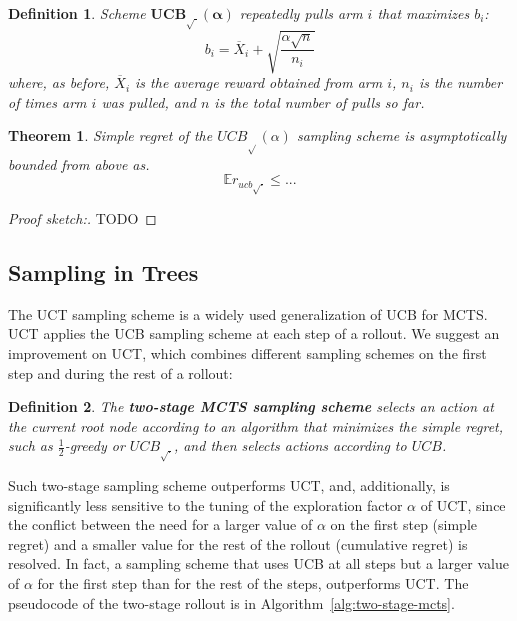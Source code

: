 \documentclass[letterpaper]{article}
\newcommand {\IE} {\ensuremath {\mathbb{E}}}
\newtheorem{dfn}{Definition}
\newtheorem{thm}{Theorem}
\begin{document}
\begin{dfn} Scheme $\mathbf{UCB_{\sqrt{\cdot}}(\alpha)}$ repeatedly pulls arm $i$ that
maximizes $b_i$:
\begin{equation}
b_i=\overline X_i+\sqrt {\frac {\alpha \sqrt n} {n_i}}
\end{equation}
where, as before, $\overline X_i$ is the average reward obtained from arm $i$,
$n_i$ is the number of times arm $i$ was pulled, and $n$ is the total
number of pulls so far. \end{dfn}

\begin{thm} Simple regret of the $UCB_{\sqrt{}}(\alpha)$ sampling
  scheme is asymptotically bounded from above as.
\begin{equation}
\IE r_{ucb\sqrt{\cdot}} \le ...
\end{equation}
\end{thm}
\begin{proof}[Proof sketch:] TODO
\end{proof}

\subsection{Sampling in Trees}
\label{sec:sampling-in-trees}

The UCT sampling scheme \cite{Kocsis.uct} is a widely used generalization
of UCB for MCTS.  UCT applies the UCB sampling
scheme at each step of a rollout.  We suggest an improvement on UCT,
which combines different sampling schemes on the first step and during
the rest of a rollout:
\begin{dfn}
The {\bf two-stage MCTS sampling scheme} selects an action at the
current root node according to an algorithm that minimizes the simple
regret, such as $\frac 1 2$-greedy or $UCB_{\sqrt{\cdot}}$, and then
selects actions according to $UCB$.
\end{dfn}

Such two-stage sampling scheme outperforms UCT, and, additionally, is
significantly less sensitive to the tuning of the exploration factor
$\alpha$ of UCT, since the conflict between the need for a larger
value of $\alpha$ on the first step (simple regret) and a smaller
value for the rest of the rollout (cumulative regret)
\cite{Bubeck.pure} is resolved. In fact, a sampling scheme that uses
UCB at all steps but a larger value of $\alpha$ for the first step
than for the rest of the steps, outperforms UCT. The pseudocode of the
two-stage rollout is in Algorithm~\ref{alg:two-stage-mcts}.
\end{document}
